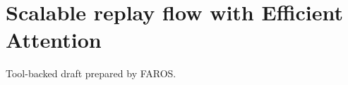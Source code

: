 \documentclass{article}
\begin{document}
\section*{Scalable replay flow with Efficient Attention}
Tool-backed draft prepared by FAROS.
\end{document}
